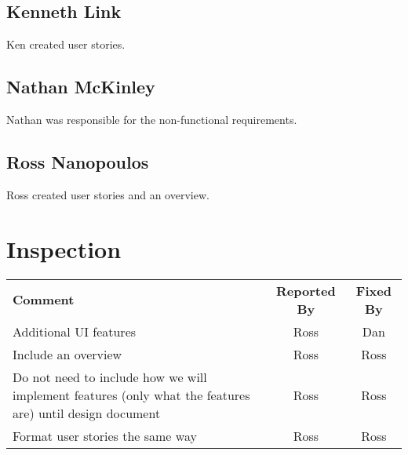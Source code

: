 \documentclass[letter]{scrartcl}
\begin{document}
\subsection{Kenneth Link}
Ken created user stories.
\subsection{Nathan McKinley}
Nathan was responsible for the non-functional requirements.
\subsection{Ross Nanopoulos}
Ross created user stories and an overview.

\section{Inspection}
\begin{tabularx}{\textwidth}{X c c}
\textbf{Comment} & \textbf{Reported By} & \textbf{Fixed By} \\
Additional UI features & Ross & Dan \\
Include an overview & Ross & Ross \\
Do not need to include how we will implement features (only what the features are) until design document & Ross & Ross \\
Format user stories the same way & Ross & Ross \\
\end{tabularx}
\end{document}

